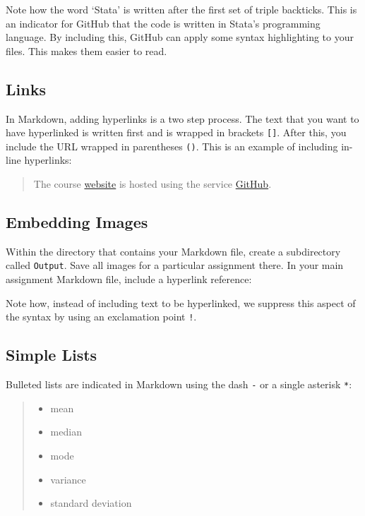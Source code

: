 \documentclass[]{book}
\providecommand{\tightlist}{%
  \setlength{\itemsep}{0pt}\setlength{\parskip}{0pt}}
\theoremstyle{definition}
\theoremstyle{definition}
\theoremstyle{remark}
\begin{document}
Note how the word `Stata' is written after the first set of triple
backticks. This is an indicator for GitHub that the code is written in
Stata's programming language. By including this, GitHub can apply some
syntax highlighting to your files. This makes them easier to read.

\subsection{Links}\label{links}

In Markdown, adding hyperlinks is a two step process. The text that you
want to have hyperlinked is written first and is wrapped in brackets
\texttt{{[}{]}}. After this, you include the URL wrapped in parentheses
\texttt{()}. This is an example of including in-line hyperlinks:

\begin{quote}
The course \href{https://github.com/slu-soc5050}{website} is hosted
using the service \href{https://github.com}{GitHub}.
\end{quote}

\subsection{Embedding Images}\label{embedding-images}

Within the directory that contains your Markdown file, create a
subdirectory called \texttt{Output}. Save all images for a particular
assignment there. In your main assignment Markdown file, include a
hyperlink reference:

Note how, instead of including text to be hyperlinked, we suppress this
aspect of the syntax by using an exclamation point \texttt{!}.

\subsection{Simple Lists}\label{simple-lists}

Bulleted lists are indicated in Markdown using the dash \texttt{-} or a
single asterisk \texttt{*}:

\begin{quote}
\begin{itemize}
\tightlist
\item
  mean
\item
  median
\item
  mode
\item
  variance
\item
  standard deviation
\end{itemize}
\end{quote}
\end{document}
